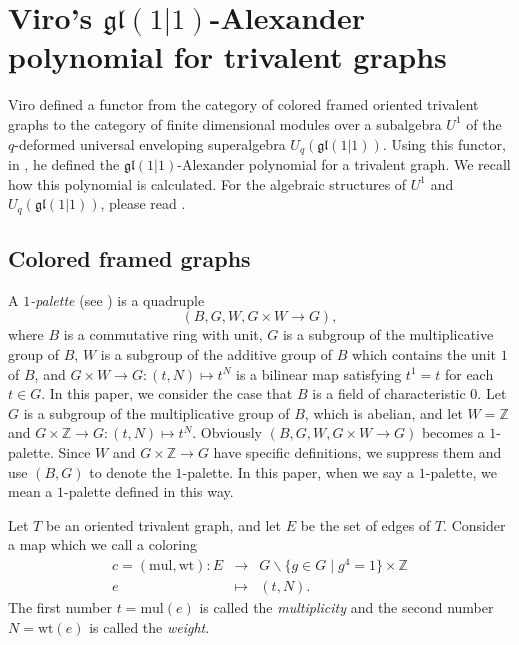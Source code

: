 \documentclass[12pt]{amsart}
\begin{document}

\medskip

\section{Viro's $\mathfrak{gl}(1\vert 1)$-Alexander polynomial for trivalent graphs}
Viro \cite{MR2255851} defined a functor from the category of colored framed oriented trivalent graphs to the category of finite dimensional modules over a subalgebra $U^1$ of the $q$-deformed universal enveloping superalgebra $U_{q}(\mathfrak{gl}(1 \vert 1))$. Using this functor, in \cite[Sect. 6]{MR2255851}, he defined the $\mathfrak{gl}(1\vert 1)$-Alexander polynomial for a trivalent graph. We recall how this polynomial is calculated. For the algebraic structures of $U^1$ and $U_{q}(\mathfrak{gl}(1 \vert 1))$, please read \cite[$\S$11: Appendix]{MR2255851}. 

\subsection{Colored framed graphs}

A {\it $1$-palette} (see \cite[2.8]{MR2255851}) is a quadruple $$(B, G, W, G\times W \to G),$$ where $B$ is a commutative ring with unit, $G$ is a subgroup of the multiplicative group of $B$, $W$ is a subgroup of the additive group of $B$ which contains the unit $1$ of $B$, and $G\times W \to G: (t, N)\mapsto t^{N}$ is a bilinear map satisfying $t^1=t$ for each $t\in G$. 
In this paper, we consider the case that $B$ is a field of characteristic $0$. Let $G$ is a subgroup of the multiplicative group of $B$, which is abelian, and let $W=\mathbb{Z}$ and $G\times \mathbb{Z} \to G: (t, N)\mapsto t^{N}$. Obviously $(B, G, W, G\times W \to G)$ becomes a $1$-palette. Since $W$ and $G\times \mathbb{Z} \to G$ have specific definitions, we suppress them and use $(B, G)$ to denote the $1$-palette. In this paper, when we say a $1$-palette, we mean a $1$-palette defined in this way.

Let $T$ be an oriented trivalent graph, and let $E$ be the set of edges of $T$. Consider a map which we call a coloring
\begin{eqnarray*}
c=(\mathrm{mul}, \mathrm{wt}): E &\to& G\backslash \{g\in G \mid g^4=1\}\times \mathbb{Z}\\
e &\mapsto& (t, N).
\end{eqnarray*} 
The first number $t=\mathrm{mul}(e)$ is called the {\it multiplicity} and the second number $N=\mathrm{wt}(e)$ is called the {\it weight}. 
\end{document}

